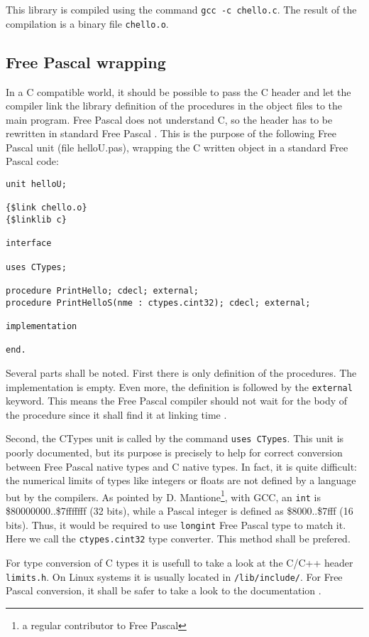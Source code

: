 \documentclass[A4paper]{article}
\begin{document}
This library is compiled using the command \verb|gcc -c chello.c|. The result
of the compilation is a binary file \verb|chello.o|.

\subsection{Free Pascal wrapping}

In a C compatible world, it should be possible to pass the C header and let
the compiler link the library definition of the procedures in the object files
to the main program. Free Pascal does not understand C, so the header has to
be rewritten in standard Free Pascal \cite{FPDoc,FPFor}. This is the purpose
of the following Free Pascal unit (file helloU.pas), wrapping the C written
object in a standard Free Pascal code:

\begin{verbatim}
unit helloU;

{$link chello.o}
{$linklib c}

interface

uses CTypes;

procedure PrintHello; cdecl; external;
procedure PrintHelloS(nme : ctypes.cint32); cdecl; external;

implementation

end.
\end{verbatim}

Several parts shall be noted. First there is only definition of the
procedures. The implementation is empty. Even more, the definition is followed
by the \verb|external| keyword. This means the Free Pascal compiler should not
wait for the body of the procedure since it shall find it at linking
time \cite{FPDoc,FPFor}.

Second, the CTypes unit is called by the command \verb|uses CTypes|. This unit
is poorly documented, but its purpose is precisely to help for correct
conversion between Free Pascal native types and C native types. In fact, it is
quite difficult: the numerical limits of types like integers or floats are not
defined by a language but by the compilers. As pointed by
D. Mantione\footnote{a regular contributor to Free Pascal}, with GCC, an
\verb|int| is \$80000000..\$7fffffff (32 bits), while a Pascal integer is
defined as \$8000..\$7fff (16 bits). Thus, it would be required to use
\verb|longint| Free Pascal type to match it. Here we call the
\verb|ctypes.cint32| type converter. This method shall be prefered.

For type conversion of C types it is usefull to take a look at the
C/C++ header \verb|limits.h|. On Linux systems it is usually located in
\verb|/lib/include/|. For Free Pascal conversion, it shall be safer to take a
look to the documentation \cite{FPDoc,FPFor}.
\end{document}
